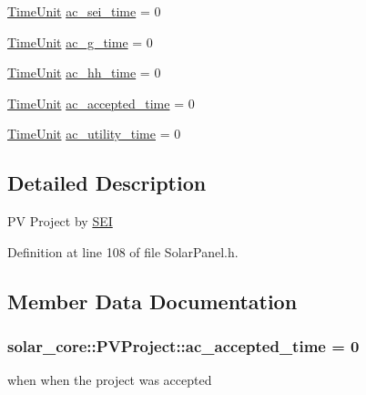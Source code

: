 \begin{DoxyCompactItemize}
\item 
\hyperlink{namespacesolar__core_a4b5949d07259da6f8a20d12a30403e90}{Time\+Unit} \hyperlink{classsolar__core_1_1_p_v_project_a0a78a4b527a897aac39e5572fbb5a842}{ac\+\_\+sei\+\_\+time} = 0
\item 
\hyperlink{namespacesolar__core_a4b5949d07259da6f8a20d12a30403e90}{Time\+Unit} \hyperlink{classsolar__core_1_1_p_v_project_a9be23309024672b4be445f68c73e42a6}{ac\+\_\+g\+\_\+time} = 0
\item 
\hyperlink{namespacesolar__core_a4b5949d07259da6f8a20d12a30403e90}{Time\+Unit} \hyperlink{classsolar__core_1_1_p_v_project_ab6196935ca6f777b28a944642efdbf84}{ac\+\_\+hh\+\_\+time} = 0
\item 
\hyperlink{namespacesolar__core_a4b5949d07259da6f8a20d12a30403e90}{Time\+Unit} \hyperlink{classsolar__core_1_1_p_v_project_a1affdb487e749b689fe2bcbd9c79613c}{ac\+\_\+accepted\+\_\+time} = 0
\item 
\hyperlink{namespacesolar__core_a4b5949d07259da6f8a20d12a30403e90}{Time\+Unit} \hyperlink{classsolar__core_1_1_p_v_project_a7a44008469a8db9a47038e2945a5d723}{ac\+\_\+utility\+\_\+time} = 0
\end{DoxyCompactItemize}


\subsection{Detailed Description}
P\+V Project by \hyperlink{classsolar__core_1_1_s_e_i}{S\+E\+I} 

Definition at line 108 of file Solar\+Panel.\+h.



\subsection{Member Data Documentation}
\hypertarget{classsolar__core_1_1_p_v_project_a1affdb487e749b689fe2bcbd9c79613c}{}
\subsubsection[{ac\+\_\+accepted\+\_\+time}]{ solar\+\_\+core\+::\+P\+V\+Project\+::ac\+\_\+accepted\+\_\+time = 0}\label{classsolar__core_1_1_p_v_project_a1affdb487e749b689fe2bcbd9c79613c}
when when the project was accepted 

